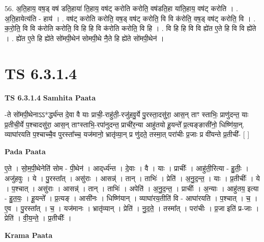 \documentclass[17pt]{extarticle}
\begin{document}
56. अ॒ति॒हाय॒ वष॒ड् वष॑ डति॒हाया॑ ति॒हाय॒ वष॑ट् करोति करोति॒ वष॑डति॒हा या॑ति॒हाय॒ वष॑ट् करोति । . अ॒ति॒हायेत्य॑ति - हाय॑ । . वष॑ट् करोति करोति॒ वष॒ड् वष॑ट् करोति॒ वि वि क॑रोति॒ वष॒ड् वष॑ट् करोति॒ वि । . क॒रो॒ति॒ वि वि क॑रोति करोति॒ वि हि हि वि क॑रोति करोति॒ वि हि । . वि हि हि वि वि ह्ये॑त ए॒ते हि वि वि ह्ये॑ते । . ह्ये॑त ए॒ते हि ह्ये॑ते सो॑मपी॒थेन॑ सोमपी॒थे नै॒ते हि ह्ये॑ते सो॑मपी॒थेन॑ । \newline
\pagebreak
{}

\section{ TS 6.3.1.4 }

\textbf{TS 6.3.1.4 } \newline
\textbf{Samhita Paata} \newline

-ते सो॑मपी॒थेनाऽऽ*र्द्ध्य॑न्त दे॒वा वै याः प्राची॒-राहु॑ती॒-रजु॑हवु॒र्ये पु॒रस्ता॒दसु॑रा॒ आस॒न् ताꣳ स्ताभिः॒ प्राणु॑दन्त॒ याः प्र॒तीची॒र्ये प॒श्चादसु॑रा॒ आस॒न् ताꣳस्ताभि॒-रपा॑नुदन्त॒ प्राची॑र॒न्या आहु॑तयो हू॒यन्ते᳚ प्र॒त्यङ्ङासी॑नो॒ धिष्णि॑या॒न्. व्याघा॑रयति प॒श्चाच्चै॒व पुरस्ता᳚च्च॒ यज॑मानो॒ भ्रातृ॑व्या॒न् प्र णु॑दते॒ तस्मा॒त् परा॑चीः प्र॒जाः प्र वी॑यन्ते प्र॒तीची᳚- [  ] \newline

\textbf{Pada Paata} \newline

ए॒ते । सो॒म॒पी॒थेनेति॑ सोम - पी॒थेन॑ । आद्‌र्ध्य॑न्त । दे॒वाः । वै । याः । प्राचीः᳚ । आहु॑ती॒रित्या - हु॒तीः॒ । अजु॑हवुः । ये । पु॒रस्ता᳚त् । असु॑राः । आसन्न्॑ । तान् । ताभिः॑ । प्रेति॑ । अ॒नु॒द॒न्त॒ । याः । प्र॒तीचीः᳚ । ये । प॒श्चात् । असु॑राः । आसन्न्॑ । तान् । ताभिः॑ । अपेति॑ । अ॒नु॒द॒न्त॒ । प्राचीः᳚ । अ॒न्याः । आहु॑तय॒ इत्या - हु॒त॒यः॒ । हू॒यन्ते᳚ । प्र॒त्यङ् । आसी॑नः । धिष्णि॑यान् । व्याघा॑रय॒तीति॑ वि - आघा॑रयति । प॒श्चात् । च॒ । ए॒व । पु॒रस्ता᳚त् । च॒ । यज॑मानः । भ्रातृ॑व्यान् । प्रेति॑ । नु॒द॒ते॒ । तस्मा᳚त् । परा॑चीः । प्र॒जा इति॑ प्र-जाः । प्रेति॑ । वी॒य॒न्ते॒ । प्र॒तीचीः᳚ ।  \newline


\textbf{Krama Paata} \newline
\end{document}
